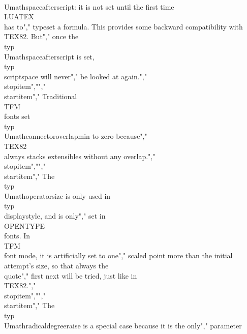 {\\Umathspaceafterscript}: it is not set until the first time \\LUATEX\\ has to","    typeset a formula. This provides some backward compatibility with \\TEX82. But","    once the \\typ {\\Umathspaceafterscript} is set, \\typ {\\scriptspace} will never","    be looked at again.","\\stopitem","","\\startitem","    Traditional \\TFM\\ fonts set \\typ {\\Umathconnectoroverlapmin} to zero because","    \\TEX82\\ always stacks extensibles without any overlap.","\\stopitem","","\\startitem","    The \\typ {\\Umathoperatorsize} is only used in \\typ {\\displaystyle}, and is only","    set in \\OPENTYPE\\ fonts. In \\TFM\\ font mode, it is artificially set to one","    scaled point more than the initial attempt's size, so that always the \\quote","    {first next} will be tried, just like in \\TEX82.","\\stopitem","","\\startitem","    The \\typ {\\Umathradicaldegreeraise} is a special case because it is the only","    parameter 